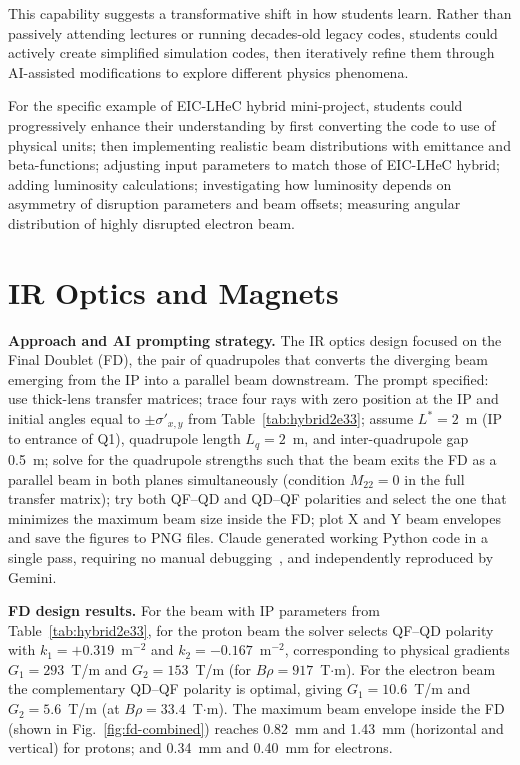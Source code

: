 \documentclass[%
               refpage,       %
               biblatex,     %
               hyphens,      %
               ]{jacow}
\begin{document}
This capability suggests a transformative shift in how students learn. Rather than passively attending lectures or running decades-old legacy codes, students could actively create simplified simulation codes, then iteratively refine them through AI-assisted modifications to explore different physics phenomena.

For the specific example of EIC-LHeC hybrid mini-project, students could progressively enhance their understanding by first converting the code to use of physical units; then implementing realistic beam distributions with emittance and beta-functions; adjusting input parameters to match those of EIC-LHeC hybrid; adding luminosity calculations; investigating how luminosity depends on asymmetry of disruption parameters and beam offsets; measuring angular distribution of highly disrupted electron beam. 

\section{IR Optics and Magnets}                                                
   
  \textbf{Approach and AI prompting strategy.}                                   
  The IR optics design focused on the Final Doublet (FD), the pair of
  quadrupoles that converts the diverging beam emerging from the IP into         
  a parallel beam downstream.                               
  The prompt specified: use thick-lens transfer matrices; trace four rays        
  with zero position at the IP and initial angles equal to  
  $\pm\sigma'_{x,y}$ from Table~\ref{tab:hybrid2e33}; assume                     
  $L^{*}=2$~m (IP to entrance of Q1), quadrupole length $L_q=2$~m, and           
  inter-quadrupole gap 0.5~m; solve for the quadrupole strengths such that       
  the beam exits the FD as a parallel beam in both planes simultaneously         
  (condition $M_{22}=0$ in the full transfer matrix); try both QF--QD and
  QD--QF polarities and select the one that minimizes the maximum beam           
  size inside the FD; plot X and Y beam envelopes and save the figures to
  PNG files.                                                                     
  Claude generated working Python code in a single pass, requiring no
  manual debugging~\cite{GitHub}, and independently reproduced by Gemini.                                                
                                                                                 
  \textbf{FD design results.}
For the beam with IP parameters from 
Table~\ref{tab:hybrid2e33}, for the proton beam  
the solver selects QF--QD polarity with           
  $k_1=+0.319$~m$^{-2}$ and $k_2=-0.167$~m$^{-2}$, corresponding to              
  physical gradients $G_1=293$~T/m and $G_2=153$~T/m (for $B\rho=917$~T$\cdot$m). 
For the electron beam the complementary QD--QF polarity is
  optimal, giving $G_1=10.6$~T/m and $G_2=5.6$~T/m (at $B\rho=33.4$~T$\cdot$m). 
  The maximum beam envelope inside the FD (shown in      
  Fig.~\ref{fig:fd-combined}) reaches 0.82~mm and 1.43~mm (horizontal and vertical) for protons; and 0.34~mm and 0.40~mm for electrons.            
  
\end{document}
